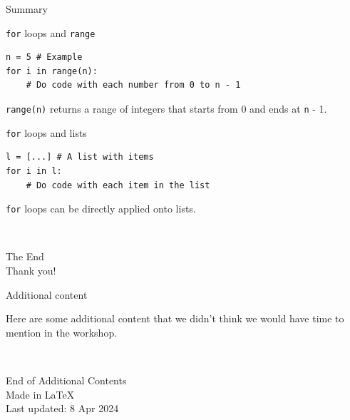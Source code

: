 \documentclass[dvipsnames, svgnames, x11names]{beamer}
\begin{document}
\begin{frame}[fragile]{Summary}
\begin{block}{\texttt{for} loops and \texttt{range}}
\begin{verbatim}
n = 5 # Example
for i in range(n):
    # Do code with each number from 0 to n - 1
\end{verbatim}
\texttt{range(n)} returns a range of integers that starts from 0 and ends at \texttt{n} - 1.
\end{block}

\begin{block}{\texttt{for} loops and lists}
\begin{verbatim}
l = [...] # A list with items
for i in l:
    # Do code with each item in the list
\end{verbatim}
\texttt{for} loops can be directly applied onto lists.
\end{block}
\end{frame}

\begin{frame}{ \ }
	\begin{center}
		The End\\
		Thank you!
	\end{center}
\end{frame}






\setcounter{framenumber}{0}











\begin{frame}{Additional content}
	\begin{center}
		Here are some additional content that we didn't think we would have time to mention in the workshop.
	\end{center}
\end{frame}

\begin{frame}{ \ }
	\begin{center}
		End of Additional Contents\\
		Made in \LaTeX\\
		Last updated: 8 Apr 2024
	\end{center}
\end{frame}
\end{document}
